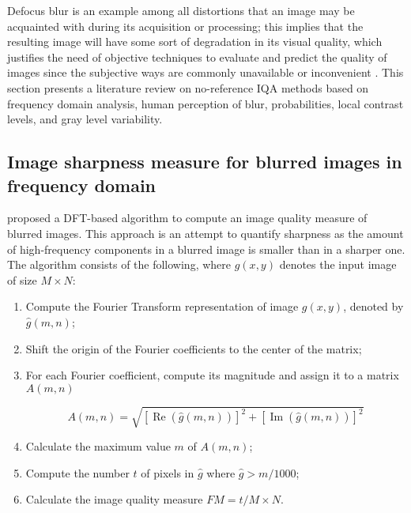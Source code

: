 Defocus blur is an example among all distortions that an image may be acquainted with during its acquisition or processing; this implies that the resulting image will have some sort of degradation in its visual quality, which justifies the need of objective techniques to evaluate and predict the quality of images since the subjective ways are commonly unavailable or inconvenient \cite{wang2004image}. This section presents a literature review on no-reference IQA methods based on frequency domain analysis, human perception of blur, probabilities, local contrast levels, and gray level variability. 

\subsection{Image sharpness measure for blurred images in frequency domain}

 proposed a DFT-based algorithm to compute an image quality measure of blurred images. This approach is an attempt to quantify sharpness as the amount of high-frequency components in a blurred image is smaller than in a sharper one. The algorithm consists of the following, where $g(x,y)$ denotes the input image of size $M \times N$:

\begin{enumerate}[label=\Roman* -]
    \item Compute the Fourier Transform representation of image $g(x,y)$, denoted by $\hat{g}(m,n)$;
    
    \item Shift the origin of the Fourier coefficients to the center of the matrix;
    
    \item For each Fourier coefficient, compute its magnitude and assign it to a matrix $A(m,n)$
    
    \begin{equation*}
        A(m,n) = \sqrt{
            [\operatorname{Re}{(\hat{g}(m,n))}]^{2}
            + [\operatorname{Im}{(\hat{g}(m,n))}]^{2}
          }
    \end{equation*}
    
    \item  Calculate the maximum value $m$ of $A(m,n)$; 
    
    \item Compute the number $t$ of pixels in $\hat{g}$ where $\hat{g} > m /1000$;
    
    \item Calculate the image quality measure $FM = t /M \times N$.
\end{enumerate}

